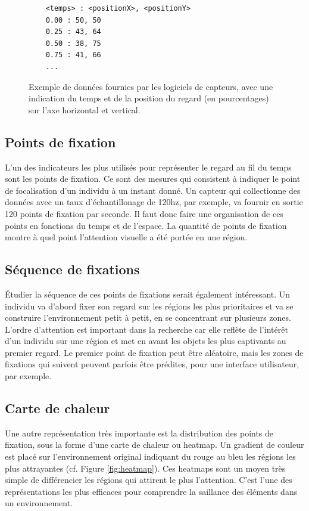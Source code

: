 \documentclass[hidelinks,12pt]{article}
\begin{document}
\begin{figure}[htpb]
  \begin{lstlisting}
    <temps> : <positionX>, <positionY>
    0.00 : 50, 50
    0.25 : 43, 64
    0.50 : 38, 75
    0.75 : 41, 66
    ...
  \end{lstlisting}
  \caption{Exemple de données fournies par les logiciels de capteurs, avec une
    indication du temps et de la position du regard (en pourcentages) sur l'axe
    horizontal et vertical.}
  \label{fig:donnees}
\end{figure}

\subsection{Points de fixation}

L'un des indicateurs les plus utilisés pour représenter le regard au fil du
temps sont les points de fixation. Ce sont des mesures qui consistent à indiquer
le point de focalisation d'un individu à un instant donné. Un capteur qui
collectionne des données avec un taux d'échantillonage de 120hz, par exemple, va
fournir en sortie 120 points de fixation par seconde. Il faut donc faire une
organisation de ces points en fonctions du temps et de l'espace. La quantité de
points de fixation montre à quel point l'attention visuelle a été portée en une
région.

\subsection{Séquence de fixations}

Étudier la séquence de ces points de fixations serait également intéressant. Un
individu va d'abord fixer son regard sur les régions les plus prioritaires et va
se construire l'environnement petit à petit, en se concentrant sur plusieurs
zones. L'ordre d'attention est important dans la recherche car elle reflète de
l'intérêt d'un individu sur une région et met en avant les objets les plus
captivants au premier regard. Le premier point de fixation peut être aléatoire,
mais les zones de fixations qui suivent peuvent parfois être prédites, pour
une interface utilisateur, par exemple.

\subsection{Carte de chaleur}

Une autre représentation très importante est la distribution des points de
fixation, sous la forme d'une carte de chaleur ou heatmap. Un gradient de
couleur est placé sur l'environnement original indiquant du rouge au bleu les
régions les plus attrayantes (cf. Figure \ref{fig:heatmap}). Ces heatmaps sont
un moyen très simple de différencier les régions qui attirent le plus
l'attention. C'est l'une des représentations les plus efficaces pour comprendre
la saillance des éléments dans un environnement.
\end{document}
